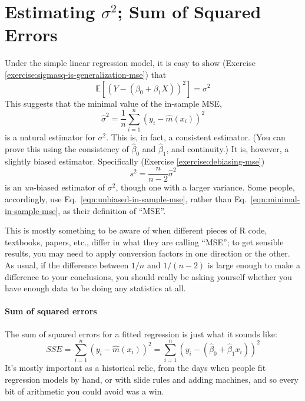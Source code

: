 \documentclass{article}
\newcommand{\Expect}[1]{\mathbb{E}\left[ #1 \right]}
\begin{document}
\clearpage

\section{Estimating $\sigma^2$; Sum of Squared Errors}

Under the simple linear regression model, it is easy to show (Exercise \ref{exercise:sigmasq-is-generalization-mse}) that
\begin{equation}
\label{eqn:sigmasq-is-generalization-mse}
\Expect{(Y-(\beta_0 + \beta_1 X))^2} = \sigma^2
\end{equation}
This suggests that the minimal value of the in-sample MSE,
\begin{equation}
\label{eqn:minimal-in-sample-mse}
\hat{\sigma}^2 = \frac{1}{n}\sum_{i=1}^{n}{(y_i - \hat{m}(x_i))^2}
\end{equation}
is a natural estimator for $\sigma^2$.  This is, in fact, a consistent
estimator.  (You can prove this using the consistency of $\hat{\beta}_0$ and
$\hat{\beta}_1$, and continuity.)  It is, however, a slightly biased estimator.
Specifically (Exercise \ref{exercise:debiasing-mse})
\begin{equation}
\label{eqn:unbiased-in-sample-mse} s^2 = \frac{n}{n-2} \hat{\sigma}^2
\end{equation}
is an {\em un}-biased estimator of $\sigma^2$, though one with a larger
variance.  Some people, accordingly, use Eq.\ \ref{eqn:unbiased-in-sample-mse},
rather than Eq.\ \ref{eqn:minimal-in-sample-mse}, as their definition
of ``MSE''.

This is mostly something to be aware of when different pieces of R code,
textbooks, papers, etc., differ in what they are calling ``MSE''; to get
sensible results, you may need to apply conversion factors in one direction or
the other.  As usual, if the difference between $1/n$ and $1/(n-2)$ is large
enough to make a difference to your conclusions, you should really be asking
yourself whether you have enough data to be doing any statistics at all.

\paragraph{Sum of squared errors} The sum of squared errors for a fitted
regression is just what it sounds like:
\begin{equation}
SSE = \sum_{i=1}^{n}{(y_i - \hat{m}(x_i))^2} = \sum_{i=1}^{n}{(y_i - (\hat{\beta}_0+\hat{\beta}_1 x_i))^2}
\end{equation}
It's mostly important as a historical relic, from the days when people fit
regression models by hand, or with slide rules and adding machines, and so
every bit of arithmetic you could avoid was a win.
\end{document}
